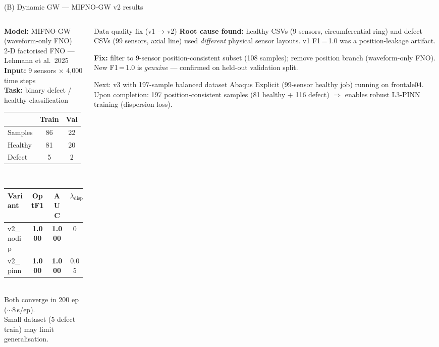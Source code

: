 \documentclass[aspectratio=169, 10pt]{beamer}
\newcommand{\best}[1]{\textbf{\textcolor{luhblue}{#1}}}
\begin{document}
\begin{frame}{(B) Dynamic GW — MIFNO-GW v2 results}
\begin{columns}[T]
\begin{column}{0.50\textwidth}
\textbf{Model:} MIFNO-GW (waveform-only FNO)\\
{\footnotesize 2-D factorised FNO — Lehmann et al.\ 2025}\\[4pt]
\textbf{Input:} 9 sensors $\times$ 4{,}000 time steps\\
\textbf{Task:} binary defect / healthy classification\\[4pt]
\begin{tabular}{lcc}
\toprule
 & Train & Val \\
\midrule
Samples & 86 & 22 \\
Healthy & 81 & 20 \\
Defect  & 5  & 2  \\
\bottomrule
\end{tabular}\\[6pt]
\begin{tabular}{lccc}
\toprule
Variant & OptF1 & AUC & $\lambda_\text{disp}$ \\
\midrule
v2\_nodip & \best{1.000} & \best{1.000} & 0 \\
v2\_pinn  & \best{1.000} & \best{1.000} & 0.05 \\
\bottomrule
\end{tabular}\\[4pt]
{\footnotesize Both converge in 200 ep ($\sim$8\,s/ep).\\
Small dataset (5 defect train) may limit generalisation.}
\end{column}
\begin{column}{0.48\textwidth}
\begin{block}{Data quality fix (v1 → v2)}
\textbf{Root cause found:} healthy CSVs (9 sensors, circumferential ring)
and defect CSVs (99 sensors, axial line) used \emph{different} physical
sensor layouts. v1 F1\,=\,1.0 was a position-leakage artifact.

\smallskip
\textbf{Fix:} filter to 9-sensor position-consistent subset (108 samples);
remove position branch (waveform-only FNO). New F1\,=\,1.0 is \emph{genuine}
— confirmed on held-out validation split.
\end{block}
\vspace{4pt}
\begin{block}{Next: v3 with 197-sample balanced dataset}
Abaqus Explicit (99-sensor healthy job) running on frontale04.
Upon completion: 197 position-consistent samples (81 healthy + 116 defect)
$\Rightarrow$ enables robust L3-PINN training (dispersion loss).
\end{block}
\end{column}
\end{columns}
\end{frame}
\end{document}
